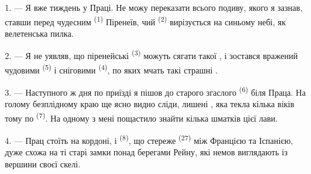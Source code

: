 %

\VUsaut{4.0mm}
\VUsaut{3.0mm}

\VUsaut{3.0mm}

\VUsaut{3.0mm}

1. --- Я вже тиждень у Праці. Не можу переказати всього подиву, якого я зазнав,
ставши перед чудесним  \textsuperscript{(1)} Піренеїв,
чий  \textsuperscript{(2)} вирізується на синьому небі, як
велетенська пилка.

2. --- Я не уявляв, що піренейські  \textsuperscript{(3)} можуть
сягати такої , і зостався вражений чудовими 
\textsuperscript{(5)} і сніговими  \textsuperscript{(4)}, по яких
мчать такі страшні .

\VUsaut{3.0mm}
\VUsaut{3.0mm}

3. --- Наступного ж дня по приїзді я пішов до старого згаслого 
\textsuperscript{(6)} біля Праца. На голому безплідному краю  ще
ясно видно сліди, лишені , яка текла кілька віків тому по
 \textsuperscript{(7)}. На одному з  мені
пощастило знайти кілька шматків цієї лави.

4. --- Прац стоїть на кордоні, і  \textsuperscript{(8)}, що
стереже  \textsuperscript{(27)} між Францією та Іспанією, дуже
схожа на ті старі замки понад берегами Рейну, які немов виглядають
 із вершини своєї скелі.

